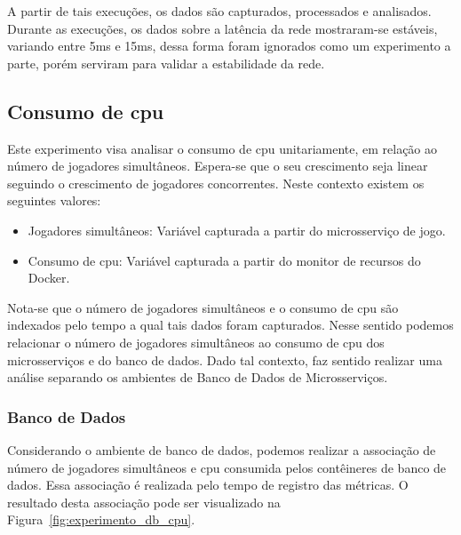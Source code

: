 A partir de tais execuções, os dados são capturados, processados e analisados.
%
Durante as execuções, os dados sobre a latência da rede mostraram-se estáveis, variando entre 5ms e 15ms, dessa forma foram ignorados como um experimento a parte, porém serviram para validar a estabilidade da rede.



\subsection{Consumo de \ac{cpu}}



Este experimento visa analisar o consumo de \ac{cpu} unitariamente, em relação ao número de jogadores simultâneos.
%
Espera-se que o seu crescimento seja linear seguindo o crescimento de jogadores concorrentes.
%
Neste contexto existem os seguintes valores:



\begin{itemize}
    \item Jogadores simultâneos: Variável capturada a partir do microsserviço de jogo.
    \item Consumo de \ac{cpu}: Variável capturada a partir do monitor de recursos do Docker.
\end{itemize}

Nota-se que o número de jogadores simultâneos e o consumo de \ac{cpu} são indexados pelo tempo a qual tais dados foram capturados.
%
Nesse sentido podemos relacionar o número de jogadores simultâneos ao consumo de \ac{cpu} dos microsserviços e do banco de dados.
%
Dado tal contexto, faz sentido realizar uma análise separando os ambientes de Banco de Dados de Microsserviços.

\subsubsection{Banco de Dados}



Considerando o ambiente de banco de dados, podemos realizar a associação de número de jogadores simultâneos e \ac{cpu} consumida pelos contêineres de banco de dados.
%
Essa associação é realizada pelo tempo de registro das métricas.
%
O resultado desta associação pode ser visualizado na Figura~\ref{fig:experimento_db_cpu}.




